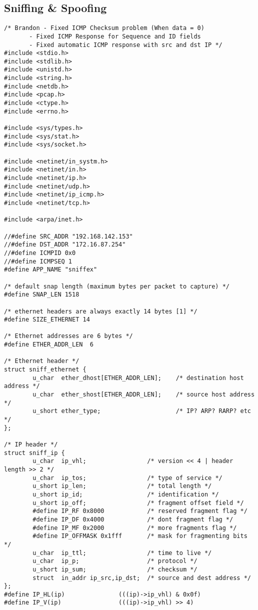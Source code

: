 \documentclass[a4paper,12pt]{article}
\begin{document}
			\subsection{Sniffing \& Spoofing}
			\label{ch:SniffSpoof}
			\begin{verbatim}
/* Brandon - Fixed ICMP Checksum problem (When data = 0)
	   - Fixed ICMP Response for Sequence and ID fields
	   - Fixed automatic ICMP response with src and dst IP */
#include <stdio.h>
#include <stdlib.h>
#include <unistd.h>
#include <string.h>
#include <netdb.h>
#include <pcap.h>
#include <ctype.h>
#include <errno.h>

#include <sys/types.h>
#include <sys/stat.h>
#include <sys/socket.h>

#include <netinet/in_systm.h>
#include <netinet/in.h>
#include <netinet/ip.h>
#include <netinet/udp.h>
#include <netinet/ip_icmp.h>
#include <netinet/tcp.h>

#include <arpa/inet.h>

//#define SRC_ADDR "192.168.142.153"
//#define DST_ADDR "172.16.87.254"
//#define ICMPID 0x0
//#define ICMPSEQ 1
#define APP_NAME "sniffex"

/* default snap length (maximum bytes per packet to capture) */
#define SNAP_LEN 1518

/* ethernet headers are always exactly 14 bytes [1] */
#define SIZE_ETHERNET 14

/* Ethernet addresses are 6 bytes */
#define ETHER_ADDR_LEN	6

/* Ethernet header */
struct sniff_ethernet {
        u_char  ether_dhost[ETHER_ADDR_LEN];    /* destination host address */
        u_char  ether_shost[ETHER_ADDR_LEN];    /* source host address */
        u_short ether_type;                     /* IP? ARP? RARP? etc */
};

/* IP header */
struct sniff_ip {
        u_char  ip_vhl;                 /* version << 4 | header length >> 2 */
        u_char  ip_tos;                 /* type of service */
        u_short ip_len;                 /* total length */
        u_short ip_id;                  /* identification */
        u_short ip_off;                 /* fragment offset field */
        #define IP_RF 0x8000            /* reserved fragment flag */
        #define IP_DF 0x4000            /* dont fragment flag */
        #define IP_MF 0x2000            /* more fragments flag */
        #define IP_OFFMASK 0x1fff       /* mask for fragmenting bits */
        u_char  ip_ttl;                 /* time to live */
        u_char  ip_p;                   /* protocol */
        u_short ip_sum;                 /* checksum */
        struct  in_addr ip_src,ip_dst;  /* source and dest address */
};
#define IP_HL(ip)               (((ip)->ip_vhl) & 0x0f)
#define IP_V(ip)                (((ip)->ip_vhl) >> 4)


\end{verbatim}
\end{document}
